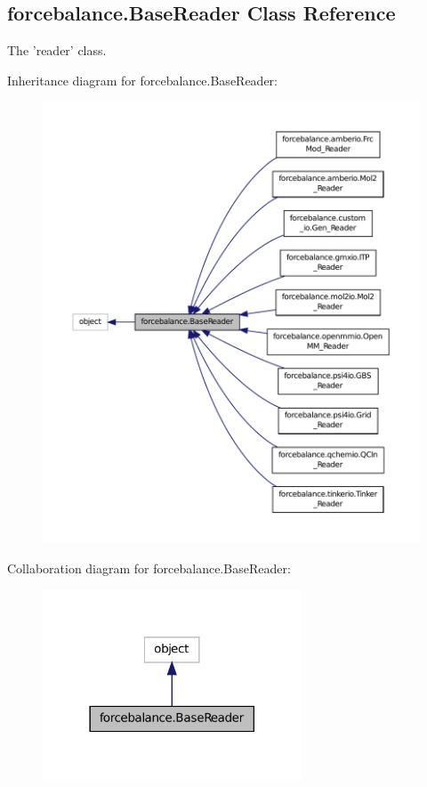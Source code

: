 \hypertarget{classforcebalance_1_1BaseReader}{\subsection{forcebalance.\-Base\-Reader Class Reference}
\label{classforcebalance_1_1BaseReader}
}


The 'reader' class.  




Inheritance diagram for forcebalance.\-Base\-Reader\-:\nopagebreak
\begin{figure}[H]
\begin{center}
\leavevmode
\includegraphics[width=350pt]{classforcebalance_1_1BaseReader__inherit__graph}
\end{center}
\end{figure}


Collaboration diagram for forcebalance.\-Base\-Reader\-:\nopagebreak
\begin{figure}[H]
\begin{center}
\leavevmode
\includegraphics[width=218pt]{classforcebalance_1_1BaseReader__coll__graph}
\end{center}
\end{figure}

